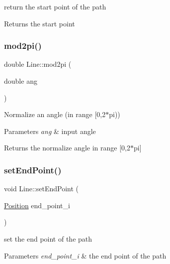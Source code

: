 return the start point of the path 

\begin{DoxyReturn}{Returns}
the start point 
\end{DoxyReturn}
\mbox{\label{class_line_aa30f3bd50c4de544874c4aaad0a24c6a}} 
\subsubsection{\texorpdfstring{mod2pi()}{mod2pi()}}
{\footnotesize\ttfamily double Line\+::mod2pi (\begin{DoxyParamCaption}\item[{double}]{ang }\end{DoxyParamCaption})}



Normalize an angle (in range \mbox{[}0,2$\ast$pi)) 


\begin{DoxyParams}{Parameters}
{\em ang} & input angle \\
\hline
\end{DoxyParams}
\begin{DoxyReturn}{Returns}
the normalize angle in range \mbox{[}0,2$\ast$pi\mbox{]} 
\end{DoxyReturn}
\mbox{\label{class_line_a47359d43675ff78f2b0af8378d952387}} 
\subsubsection{\texorpdfstring{set\+End\+Point()}{setEndPoint()}}
{\footnotesize\ttfamily void Line\+::set\+End\+Point (\begin{DoxyParamCaption}\item[{\mbox{\hyperlink{class_position}{Position}}}]{end\+\_\+point\+\_\+i }\end{DoxyParamCaption})}



set the end point of the path 


\begin{DoxyParams}{Parameters}
{\em end\+\_\+point\+\_\+i} & the end point of the path \\
\hline
\end{DoxyParams}
\mbox{\label{class_line_a387afc9536a3c054dec9eb54f45ea993}} 
